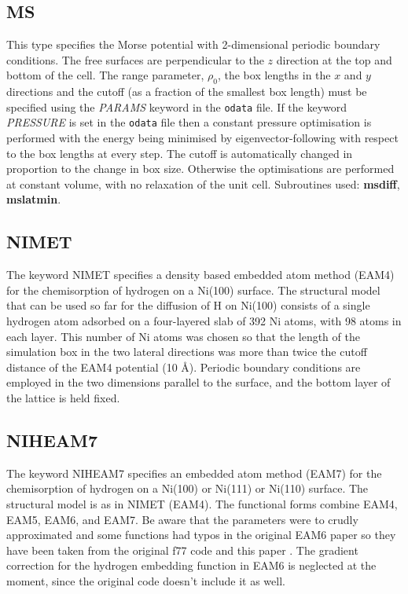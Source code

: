 \documentclass[12pt,a4paper,dvips]{article}
\begin{document}
\subsection{MS}This type specifies the Morse potential with 2-dimensional
periodic boundary conditions.
The free surfaces are perpendicular to the $z$ direction at the top and bottom
of the cell.
The range parameter, $\rho_0$, the box lengths in the $x$ and $y$ 
directions and the cutoff (as a fraction of the smallest box length)
must be specified using the {\it PARAMS\/} keyword in the {\tt odata} file.
If the keyword {\it PRESSURE\/} is set in the {\tt odata} file
then a constant pressure optimisation is performed
with the energy being minimised by eigenvector-following with respect to the 
box lengths at every step. 
The cutoff is automatically changed in proportion to the change in box size.
Otherwise the optimisations are performed at constant volume, with no 
relaxation of the unit cell. 
Subroutines used: {\bf msdiff}, {\bf mslatmin}.

\subsection{NIMET}
The keyword NIMET specifies a density based embedded atom
method (EAM4) for the chemisorption of hydrogen on a Ni(100) surface\cite{Foiles86,Daw84,Truong90a,Truong90b}.
The structural model that can be used so far for the diffusion of H
on Ni(100) consists of a single hydrogen atom adsorbed on a
four-layered slab of 392 Ni atoms, with 98 atoms in each layer.
This number of Ni atoms was chosen so that the length of the
simulation box in the two lateral directions was more than twice
the cutoff distance of the EAM4 potential (10 \AA{}).\cite{Truong90b} Periodic
boundary conditions are employed in the two dimensions
parallel to the surface, and the bottom layer of the lattice is
held fixed. 


\subsection{NIHEAM7}
The keyword NIHEAM7 specifies an embedded atom
method (EAM7) for the chemisorption of hydrogen on a Ni(100) or Ni(111) or Ni(110)
surface\cite{Foiles86,Daw84}.
The structural model is as in NIMET (EAM4). The functional forms combine 
EAM4,\cite{Truong90a,Truong90b} EAM5,\cite{Wonchoba95} EAM6,\cite{Wonchoba96} and EAM7\cite{Wonchoba98}.
Be aware that the parameters were to crudly approximated and some functions had typos in the 
original EAM6 paper so they have been taken from the original f77 code and this paper\cite{Kindt99} .
The gradient correction for the hydrogen embedding function in EAM6 is neglected at the moment, 
since the original code doesn't include it as well.
\end{document}

